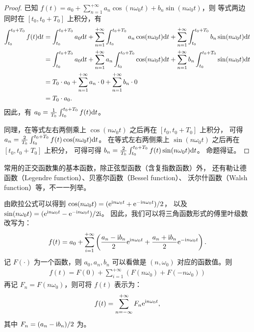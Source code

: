 \begin{proof}
    已知 $f(t) = a_0 + \sum_{n = 1}^{+\infty}a_n\cos(n\omega_0 t) + b_n\sin(n\omega_0 t)$，则
    等式两边同时在 $[t_0, t_0 + T_0]$ 上积分，有
    \begin{align*}
        \int_{t_0}^{t_0 + T_0}f(t)\mathrm{d}{t} & = \int_{t_0}^{t_0 + T_0}a_0\mathrm{d}{t} + \sum_{n = 1}^{+\infty}\int_{t_0}^{t_0 + T_0}a_n\cos(n\omega_0 t)\mathrm{d}{t} + \sum_{n = 1}^{+\infty}\int_{t_0}^{t_0 + T_0}b_n\sin(n\omega_0 t)\mathrm{d}{t} \\
        & = \int_{t_0}^{t_0 + T_0}a_0\mathrm{d}{t} + \sum_{n = 1}^{+\infty}a_n\int_{t_0}^{t_0 + T_0}\cos(n\omega_0 t)\mathrm{d}{t} + \sum_{n = 1}^{+\infty}b_n\int_{t_0}^{t_0 + T_0}\sin(n\omega_0 t)\mathrm{d}{t} \\
        & = T_0 \cdot a_0 + \sum_{n = 1}^{+\infty}a_n\cdot 0 + \sum_{n = 1}^{+\infty}b_n\cdot 0 \\
        & = T_0 \cdot a_0.
    \end{align*}
    因此，有 $a_0 = \frac{1}{T_0}\int_{t_0}^{t_0 + T_0}f(t)\mathrm{d}{t}$。

    同理，在等式左右两侧乘上 $\cos(n \omega_0 t)$ 之后再在 $[t_0, t_0 + T_0]$ 上积分，
    可得 $a_n = \frac{2}{T_0}\int_{t_0}^{t_0 + T_0}f(t)\cos(n\omega_0 t)\mathrm{d}{t}$。
    在等式左右两侧乘上 $\sin(n \omega_0 t)$ 之后再在 $[t_0, t_0 + T_0]$ 上积分，
    可得可得 $b_n = \frac{2}{T_0}\int_{t_0}^{t_0 + T_0}f(t)\sin(n\omega_0 t)\mathrm{d}{t}$。
    命题得证。
\end{proof}

\begin{remark}
    常用的正交函数集的基本函数，除正弦型函数（含复指数函数）外，
    还有勒让德函数（Legendre function）、贝塞尔函数（Bessel function）、
    沃尔什函数（Walsh function）等，不一一列举。
\end{remark}

\begin{definition}[复指数形式傅里叶级数]
    由欧拉公式可以得到 $\cos(n\omega_0 t) = (\mathrm{e}^{\mathrm{i} n\omega_0 t} + \mathrm{e}^{-\mathrm{i} n\omega_0 t}) / 2$，
    以及 $\sin(n\omega_0 t) = (\mathrm{e}^{\mathrm{i} n\omega_0 t} - \mathrm{e}^{-\mathrm{i} n\omega_0 t}) / 2\mathrm{i}$。
    因此，我们可以将三角函数形式的傅里叶级数改写为：
    \begin{align*}
        f(t) = a_0 + \sum_{i = 1}^{+\infty}\left(\frac{a_n - \mathrm{i} b_n}{2}\mathrm{e}^{\mathrm{i} n\omega_0 t} + \frac{a_n + \mathrm{i} b_n}{2}\mathrm{e}^{-\mathrm{i} n\omega_0 t}\right).
    \end{align*}
    记 $F(\cdot)$ 为一个函数，则 $a_0, a_n, b_n$ 可以看做是 $(n, \omega_0)$ 对应的函数值。则
    \begin{align*}
        f(t) = F(0) + \sum_{i = 1}^{+\infty}\left(F(n\omega_0)+ F(-n\omega_0)\right)
    \end{align*}
    再记 $F_n = F(n\omega_0)$，则可将 $f(t)$ 表示为：
    \begin{align*}
        f(t) = \sum_{n = -\infty}^{+\infty}F_n\mathrm{e}^{\mathrm{i} n\omega_0 t},
    \end{align*}
    其中 $F_n = (a_n - \mathrm{i} b_n) / 2$ 为。
\end{definition}

